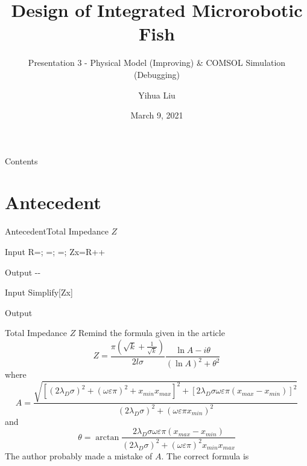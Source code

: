 \documentclass[11pt]{beamer}
\begin{document}
\title{Design of Integrated Microrobotic Fish}
\subtitle{Presentation 3 - Physical Model (Improving) \& COMSOL Simulation (Debugging)}
\author{Yihua Liu}
\date{March 9, 2021}
\maketitle
\begin{frame}{Contents}
    \tableofcontents
\end{frame}
\section{Antecedent}
\begin{frame}[fragile]{Antecedent}{Total Impedance $Z$}
    \begin{mmaCell}{Input}
        R=;
        =;
        =;
        Zx=R++
    \end{mmaCell}
    \begin{mmaCell}[addtoindex=3]{Output}
        --
    \end{mmaCell}
    \begin{mmaCell}[addtoindex=5]{Input}
        Simplify[Zx]
    \end{mmaCell}
    \begin{mmaCell}{Output}
    \end{mmaCell}
\end{frame}
\begin{frame}[fragile]{Total Impedance $Z$}
    Remind the formula given in the article
    \[Z=\frac{\pi\left(\sqrt{k}+\frac{1}{\sqrt{k}}\right)}{2l\sigma}\frac{\ln{A}-i\theta}{(\ln{A})^2+\theta^2}\]
    where
    \[A=\frac{\sqrt{\left[\left(2\lambda_D\sigma\right)^2+(\omega\varepsilon\pi)^2+x_{min}x_{max}\right]^2+\left[2\lambda_D\sigma\omega\varepsilon\pi\left(x_{max}-x_{min}\right)\right]^2}}{\left(2\lambda_D\sigma\right)^2+(\omega\varepsilon\pi x_{min})^2}\]
    and\\
    \[\theta=\arctan{\frac{2\lambda_D\sigma\omega\varepsilon\pi\left(x_{max}-x_{min}\right)}{\left(2\lambda_D\sigma\right)^2+(\omega\varepsilon\pi)^2x_{min}x_{max}}}\]
    The author probably made a mistake of $A$. The correct formula is
\end{frame}
\end{document}
